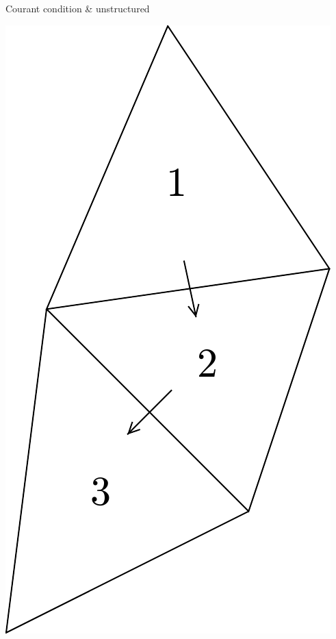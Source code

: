 \documentclass[12pt]{beamer}
\begin{document}
\begin{frame}{Courant condition \& unstructured}
\begin{example}
\begin{minipage}{0.3\textwidth}
      \includegraphics[width=\textwidth]{three_triangles}
    \end{minipage}
  \end{example}
\end{frame}
\end{document}
